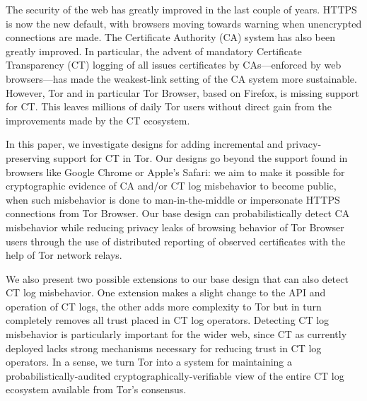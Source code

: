 The security of the web has greatly improved in the last couple of years. HTTPS
is now the new default, with browsers moving towards warning when unencrypted
connections are made. The Certificate Authority (CA) system has also been
greatly improved. In particular, the advent of mandatory Certificate
Transparency (CT) logging of all issues certificates by CAs---enforced by web
browsers---has made the weakest-link setting of the CA system more sustainable.
However, Tor and in particular Tor Browser, based on Firefox, is missing support
for CT. This leaves millions of daily Tor users without direct gain from the
improvements made by the CT ecosystem. 

In this paper, we investigate designs for adding incremental and
privacy-preserving support for CT in Tor. Our designs go beyond the support
found in browsers like Google Chrome or Apple's Safari: we aim to make it
possible for cryptographic evidence of CA and/or CT log misbehavior to become
public, when such misbehavior is done to man-in-the-middle or impersonate HTTPS
connections from Tor Browser. Our base design can probabilistically detect CA
misbehavior while reducing privacy leaks of browsing behavior of Tor Browser
users through the use of distributed reporting of observed certificates with the
help of Tor network relays.

We also present two possible extensions to our base design that can also detect
CT log misbehavior. One extension makes a slight change to the API and operation
of CT logs, the other adds more complexity to Tor but in turn completely removes
all trust placed in CT log operators. Detecting CT log misbehavior is
particularly important for the wider web, since CT as currently deployed lacks
strong mechanisms necessary for reducing trust in CT log operators. In a sense,
we turn Tor into a system for maintaining a probabilistically-audited
cryptographically-verifiable view of the entire CT log ecosystem available from
Tor’s consensus.